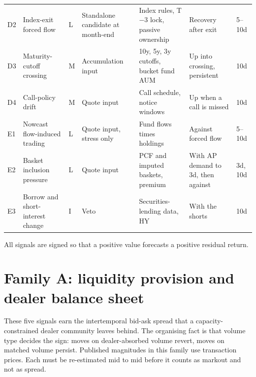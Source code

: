 \documentclass[11pt,letterpaper]{article}
\begin{document}
{\begin{longtable}{@{}p{}p{}p{}p{}p{}p{}p{}@{}}
D2 & Index-exit forced flow & L & Standalone candidate at month-end & Index rules, T$-$3 lock, passive ownership & Recovery after exit & 5--10d \\
D3 & Maturity-cutoff crossing & M & Accumulation input & 10y, 5y, 3y cutoffs, bucket fund AUM & Up into crossing, persistent & 10d \\
D4 & Call-policy drift & M & Quote input & Call schedule, notice windows & Up when a call is missed & 10d \\
E1 & Nowcast flow-induced trading & L & Quote input, stress only & Fund flows times holdings & Against forced flow & 5--10d \\
E2 & Basket inclusion pressure & L & Quote input & PCF and imputed baskets, premium & With AP demand to 3d, then against & 3d, 10d \\
E3 & Borrow and short-interest change & I & Veto & Securities-lending data, HY & With the shorts & 10d \\
\bottomrule
\end{longtable}
}

All signals are signed so that a positive value forecasts a positive residual return.

\section{Family A: liquidity provision and dealer balance sheet}
\label{sec:famA}

These five signals earn the intertemporal bid-ask spread that a capacity-constrained dealer community leaves behind. The organising fact is that volume type decides the sign: moves on dealer-absorbed volume revert, moves on matched volume persist. Published magnitudes in this family use transaction prices. Each must be re-estimated mid to mid before it counts as markout and not as spread.
\end{document}
